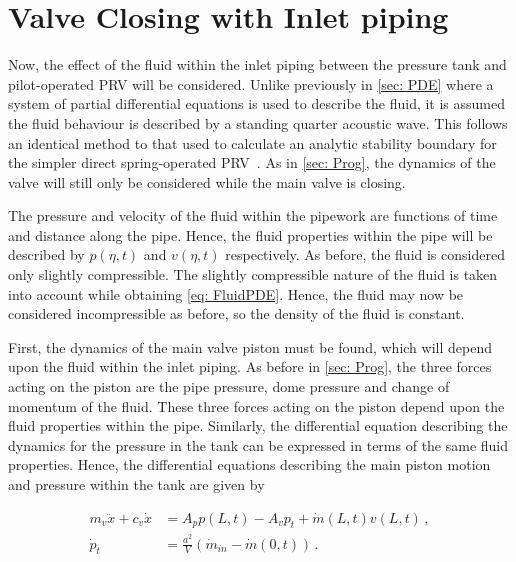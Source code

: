 \section{Valve Closing with Inlet piping}

Now, the effect of the fluid within the inlet piping between the pressure tank and pilot-operated PRV will be considered. Unlike previously in \cref{sec: PDE} where a system of partial differential equations is used to describe the fluid, it is assumed the fluid behaviour is described by a standing quarter acoustic wave. This follows an identical method to that used to calculate an analytic stability boundary for the simpler direct spring-operated PRV~\cite{Hos2015ModelPipe,Hos2015DynamicModelling,Hos2016DynamicService,Hos2017DynamicRecommendations}. As in \cref{sec: Prog}, the dynamics of the valve will still only be considered while the main valve is closing.

The pressure and velocity of the fluid within the pipework are functions of time and distance along the pipe. Hence, the fluid properties within the pipe will be described by $p(\eta,t)$ and $v(\eta,t)$ respectively. As before, the fluid is considered only slightly compressible. The slightly compressible nature of the fluid is taken into account while obtaining \cref{eq: FluidPDE}. Hence, the fluid may now be considered incompressible as before, so the density of the fluid is constant.

First, the dynamics of the main valve piston must be found, which will depend upon the fluid within the inlet piping. As before in \cref{sec: Prog}, the three forces acting on the piston are the pipe pressure, dome pressure and change of momentum of the fluid. These three forces acting on the piston depend upon the fluid properties within the pipe. Similarly, the differential equation describing the dynamics for the pressure in the tank can be expressed in terms of the same fluid properties. Hence, the differential equations describing the main piston motion and pressure within the tank are given by

\begin{equation} \label{eq: ValveODEsPipe}
\begin{split}
    m_v \ddot{x} + c_v \dot{x} &= A_p p(L,t) - A_v p_t + \dot{m}(L,t)
    v(L,t) %
    \, , \\
    \dot{p}_t &= \frac{a^2}{V} \left( \dot{m}_{in} - \dot{m}(0,t) \right) \, .
\end{split}
\end{equation}

